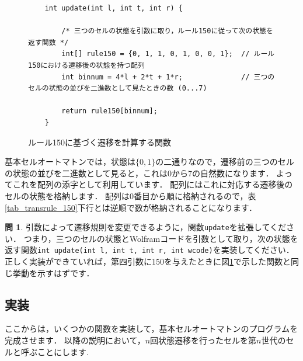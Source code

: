 \documentclass[dvipdfmx]{jsarticle}
\theoremstyle{definition}
\newtheorem{question}{問}[section]
\begin{document}
\begin{figure}[ht]
\begin{center}
\begin{oframed}
\footnotesize
\begin{verbatim}
    int update(int l, int t, int r) {

        /* 三つのセルの状態を引数に取り，ルール150に従って次の状態を返す関数 */
        int[] rule150 = {0, 1, 1, 0, 1, 0, 0, 1};  // ルール150における遷移後の状態を持つ配列
        int binnum = 4*l + 2*t + 1*r;              // 三つのセルの状態の並びを二進数として見たときの数 (0...7)

        return rule150[binnum];
    }
\end{verbatim}
\end{oframed}
\end{center}
\caption{ルール150に基づく遷移を計算する関数}
\label{code_update}
\end{figure}

基本セルオートマトンでは，状態は$\{0,1\}$の二通りなので，遷移前の三つのセルの状態の並びを二進数として見ると，これは0から7の自然数になります．
よってこれを配列の添字として利用しています．
配列にはこれに対応する遷移後のセルの状態を格納します．
配列は0番目から順に格納されるので，表\ref{tab_transrule_150}下行とは逆順で数が格納されることになります．

\vspace{\baselineskip}

\begin{question}
    \label{que_update_exp}
    引数によって遷移規則を変更できるように，関数\verb|update|を拡張してください．
    つまり，三つのセルの状態とWolframコードを引数として取り，次の状態を返す関数\verb|int update(int l, int t, int r, int wcode)|を実装してください．
    正しく実装ができていれば，第四引数に150を与えたときに図\ref{code_update}で示した関数と同じ挙動を示すはずです．
\end{question}


\subsection{実装}

ここからは，いくつかの関数を実装して，基本セルオートマトンのプログラムを完成させます．
以降の説明において，$n$回状態遷移を行ったセルを第$n$世代のセルと呼ぶことにします.


\end{document}
